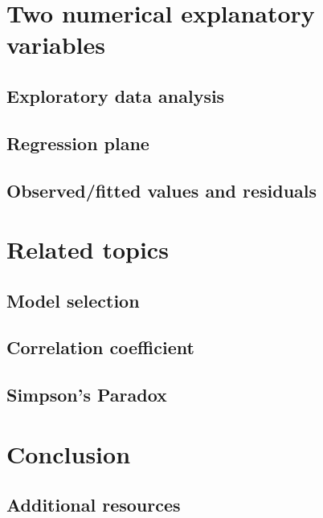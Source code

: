 \documentclass[
  12pt, krantz2,
]{krantz}
\begin{document}
\hypertarget{model3}{%
\section{Two numerical explanatory variables}\label{model3}}

\hypertarget{model3EDA}{%
\subsection{Exploratory data analysis}\label{model3EDA}}

\hypertarget{model3table}{%
\subsection{Regression plane}\label{model3table}}

\hypertarget{model3points}{%
\subsection{Observed/fitted values and residuals}\label{model3points}}

\hypertarget{related-topics-1}{%
\section{Related topics}\label{related-topics-1}}

\hypertarget{model-selection}{%
\subsection{Model selection}\label{model-selection}}

\hypertarget{correlationcoefficient2}{%
\subsection{Correlation coefficient}\label{correlationcoefficient2}}

\hypertarget{simpsonsparadox}{%
\subsection{Simpson's Paradox}\label{simpsonsparadox}}

\hypertarget{conclusion-5}{%
\section{Conclusion}\label{conclusion-5}}

\hypertarget{additional-resources-4}{%
\subsection{Additional resources}\label{additional-resources-4}}
\end{document}
